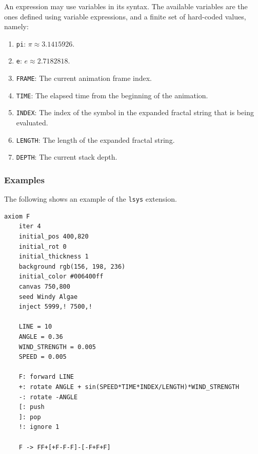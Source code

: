 \documentclass[a4paper]{article}
\begin{document}
\pagebreak

An expression may use variables in its syntax.
The available variables are the ones defined using variable expressions,
and a finite set of hard-coded values, namely:
\begin{enumerate}
    \item \texttt{pi}: \(\pi \approx 3.1415926\).
    \item \texttt{e}: \(e \approx 2.7182818\).
    \item \texttt{FRAME}: The current animation frame index.
    \item \texttt{TIME}: The elapsed time from the beginning of the animation.
    \item \texttt{INDEX}: The index of the symbol in the expanded fractal string that is being evaluated.
    \item \texttt{LENGTH}: The length of the expanded fractal string.
    \item \texttt{DEPTH}: The current stack depth.
\end{enumerate}

\pagebreak

\subsubsection{Examples}

The following shows an example of the \texttt{lsys} extension.

\begin{lstlisting}[style=boxed]
    axiom F
    iter 4
    initial_pos 400,820
    initial_rot 0
    initial_thickness 1
    background rgb(156, 198, 236)
    initial_color #006400ff
    canvas 750,800
    seed Windy Algae
    inject 5999,! 7500,!
    
    LINE = 10
    ANGLE = 0.36
    WIND_STRENGTH = 0.005
    SPEED = 0.005
    
    F: forward LINE
    +: rotate ANGLE + sin(SPEED*TIME*INDEX/LENGTH)*WIND_STRENGTH
    -: rotate -ANGLE
    [: push
    ]: pop
    !: ignore 1
    
    F -> FF+[+F-F-F]-[-F+F+F]
\end{lstlisting}

\end{document}
